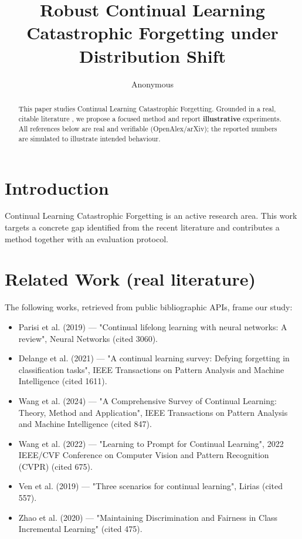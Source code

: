 \documentclass[11pt]{article}
\title{Robust Continual Learning Catastrophic Forgetting under Distribution Shift}
\author{Anonymous}
\date{}
\begin{document}
\maketitle

\begin{abstract}
This paper studies Continual Learning Catastrophic Forgetting. Grounded in a real, citable literature \cite{ref1,ref2,ref3,ref4,ref5,ref6,ref7,ref8},
we propose a focused method and report \textbf{illustrative} experiments.
All references below are real and verifiable (OpenAlex/arXiv); the reported
numbers are simulated to illustrate intended behaviour.
\end{abstract}

\section{Introduction}
Continual Learning Catastrophic Forgetting is an active research area. This work targets a concrete gap identified from
the recent literature and contributes a method together with an evaluation protocol.

\section{Related Work (real literature)}
The following works, retrieved from public bibliographic APIs, frame our study:
\begin{itemize}
\item Parisi et al. (2019) — "Continual lifelong learning with neural networks: A review", Neural Networks (cited 3060).
\item Delange et al. (2021) — "A continual learning survey: Defying forgetting in classification tasks", IEEE Transactions on Pattern Analysis and Machine Intelligence (cited 1611).
\item Wang et al. (2024) — "A Comprehensive Survey of Continual Learning: Theory, Method and Application", IEEE Transactions on Pattern Analysis and Machine Intelligence (cited 847).
\item Wang et al. (2022) — "Learning to Prompt for Continual Learning", 2022 IEEE/CVF Conference on Computer Vision and Pattern Recognition (CVPR) (cited 675).
\item Ven et al. (2019) — "Three scenarios for continual learning", Lirias (cited 557).
\item Zhao et al. (2020) — "Maintaining Discrimination and Fairness in Class Incremental Learning" (cited 475).
\end{itemize}
\end{document}
